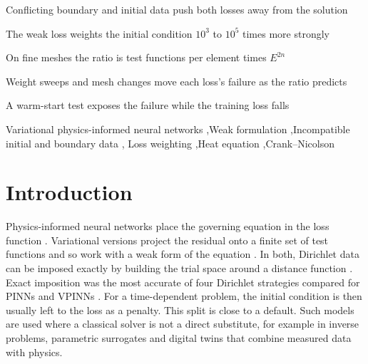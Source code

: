 \documentclass[a4paper,fleqn]{cas-sc}
\begin{document}
\begin{highlights}
\item Conflicting boundary and initial data push both losses away from the solution
\item The weak loss weights the initial condition $10^3$ to $10^5$ times more strongly
\item On fine meshes the ratio is test functions per element times $E^{2n}$
\item Weight sweeps and mesh changes move each loss's failure as the ratio predicts
\item A warm-start test exposes the failure while the training loss falls
\end{highlights}

\begin{keywords}
Variational physics-informed neural networks \sep Weak formulation \sep Incompatible initial and boundary data \sep
Loss weighting \sep Heat equation \sep Crank--Nicolson
\end{keywords}


\maketitle

\section{Introduction}
\label{sec:intro}

Physics-informed neural networks place the governing equation in the loss function \cite{raissi2019pinn}. Variational
versions project the residual onto a finite set of test functions and so work with a weak form of the equation
\cite{kharazmi2019vpinn,kharazmi2021hpvpinn,fastvpinn2024}. In both, Dirichlet data can be imposed exactly by building
the trial space around a distance function \cite{lu2021hardconstraint,sukumar2022exact}. Exact imposition was the most
accurate of four Dirichlet strategies compared for PINNs and VPINNs \cite{berrone2023dirichlet}. For a time-dependent
problem, the initial condition is then usually left to the loss as a penalty. This split is close to a default. Such models are used where a classical solver is not a direct substitute, for
example in inverse problems, parametric surrogates and digital twins that combine measured data with physics.
\end{document}

